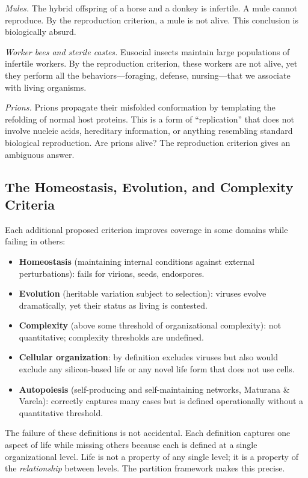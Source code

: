 \medskip
\noindent\textit{Mules.} The hybrid offspring of a horse and a donkey is
infertile. A mule cannot reproduce. By the reproduction criterion, a mule is
not alive. This conclusion is biologically absurd.

\medskip
\noindent\textit{Worker bees and sterile castes.} Eusocial insects maintain
large populations of infertile workers. By the reproduction criterion, these
workers are not alive, yet they perform all the behaviors---foraging, defense,
nursing---that we associate with living organisms.

\medskip
\noindent\textit{Prions.} Prions propagate their misfolded conformation by
templating the refolding of normal host proteins. This is a form of
``replication'' that does not involve nucleic acids, hereditary information,
or anything resembling standard biological reproduction. Are prions alive?
The reproduction criterion gives an ambiguous answer.

\subsection{The Homeostasis, Evolution, and Complexity Criteria}

Each additional proposed criterion improves coverage in some domains while
failing in others:

\begin{itemize}
  \item \textbf{Homeostasis} (maintaining internal conditions against
        external perturbations): fails for virions, seeds, endospores.
  \item \textbf{Evolution} (heritable variation subject to selection): viruses
        evolve dramatically, yet their status as living is contested.
  \item \textbf{Complexity} (above some threshold of organizational complexity):
        not quantitative; complexity thresholds are undefined.
  \item \textbf{Cellular organization}: by definition excludes viruses but
        also would exclude any silicon-based life or any novel life form that
        does not use cells.
  \item \textbf{Autopoiesis} (self-producing and self-maintaining networks,
        Maturana \& Varela): correctly captures many cases but is defined
        operationally without a quantitative threshold.
\end{itemize}

\begin{remark}
The failure of these definitions is not accidental. Each definition captures
one aspect of life while missing others because each is defined at a single
organizational level. Life is not a property of any single level; it is a
property of the \emph{relationship} between levels. The partition framework
makes this precise.
\end{remark}

